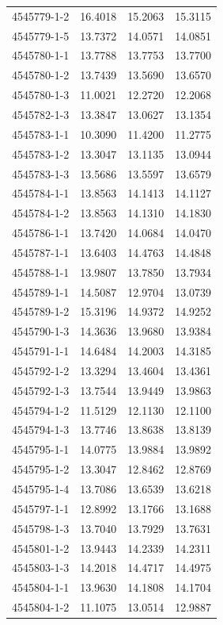 \begin{longtable}{lrrr}
4545779-1-2 & 16.4018 & 15.2063 & 15.3115 \\
4545779-1-5 & 13.7372 & 14.0571 & 14.0851 \\
4545780-1-1 & 13.7788 & 13.7753 & 13.7700 \\
4545780-1-2 & 13.7439 & 13.5690 & 13.6570 \\
4545780-1-3 & 11.0021 & 12.2720 & 12.2068 \\
4545782-1-3 & 13.3847 & 13.0627 & 13.1354 \\
4545783-1-1 & 10.3090 & 11.4200 & 11.2775 \\
4545783-1-2 & 13.3047 & 13.1135 & 13.0944 \\
4545783-1-3 & 13.5686 & 13.5597 & 13.6579 \\
4545784-1-1 & 13.8563 & 14.1413 & 14.1127 \\
4545784-1-2 & 13.8563 & 14.1310 & 14.1830 \\
4545786-1-1 & 13.7420 & 14.0684 & 14.0470 \\
4545787-1-1 & 13.6403 & 14.4763 & 14.4848 \\
4545788-1-1 & 13.9807 & 13.7850 & 13.7934 \\
4545789-1-1 & 14.5087 & 12.9704 & 13.0739 \\
4545789-1-2 & 15.3196 & 14.9372 & 14.9252 \\
4545790-1-3 & 14.3636 & 13.9680 & 13.9384 \\
4545791-1-1 & 14.6484 & 14.2003 & 14.3185 \\
4545792-1-2 & 13.3294 & 13.4604 & 13.4361 \\
4545792-1-3 & 13.7544 & 13.9449 & 13.9863 \\
4545794-1-2 & 11.5129 & 12.1130 & 12.1100 \\
4545794-1-3 & 13.7746 & 13.8638 & 13.8139 \\
4545795-1-1 & 14.0775 & 13.9884 & 13.9892 \\
4545795-1-2 & 13.3047 & 12.8462 & 12.8769 \\
4545795-1-4 & 13.7086 & 13.6539 & 13.6218 \\
4545797-1-1 & 12.8992 & 13.1766 & 13.1688 \\
4545798-1-3 & 13.7040 & 13.7929 & 13.7631 \\
4545801-1-2 & 13.9443 & 14.2339 & 14.2311 \\
4545803-1-3 & 14.2018 & 14.4717 & 14.4975 \\
4545804-1-1 & 13.9630 & 14.1808 & 14.1704 \\
4545804-1-2 & 11.1075 & 13.0514 & 12.9887 \\

\end{longtable}
